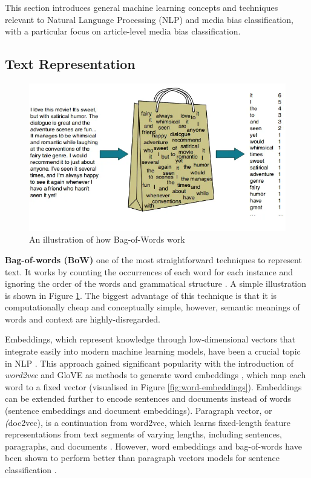 This section introduces general machine learning concepts and techniques relevant to Natural Language Processing (NLP) and media bias classification, with a particular focus on article-level media bias classification.

\subsection{Text Representation}

\begin{figure}[htbp]
    \centering
    \includegraphics[width=0.7\linewidth]{images/bow_illustration.png}
    \caption{An illustration of how Bag-of-Words work \cite{rahul-2023-bow-medium}}
    \label{fig:bow_illustration}
\end{figure}

\textbf{Bag-of-words (BoW)} one of the most straightforward techniques to represent text. It works by counting the occurrences of each word for each instance and ignoring the order of the words and grammatical structure \cite{qader-2019-bow}. A simple illustration is shown in Figure \ref{fig:bow_illustration}. The biggest advantage of this technique is that it is computationally cheap and conceptually simple, however, semantic meanings of words and context are highly-disregarded.

Embeddings, which represent knowledge through low-dimensional vectors that integrate easily into modern machine learning models, have been a crucial topic in NLP \cite{camacho-collados-2020-embeddings}. This approach gained significant popularity with the introduction of \textit{word2vec} and GloVE \cite{pennington-2014-glove} as methods to generate word embeddings \cite{mikolov-2013-embeddings}, which map each word to a fixed vector (visualised in Figure \ref{fig:word-embeddings}). Embeddings can be extended further to encode sentences and documents instead of words (sentence embeddings and document embeddings). Paragraph vector, or \textit(doc2vec), is a continuation from word2vec, which learns fixed-length feature representations from text segments of varying lengths, including sentences, paragraphs, and documents \cite{mikolov-2014-doc2vec}. However, word embeddings and bag-of-words have been shown to perform better than paragraph vectors models for sentence classification \cite{white-2015-how-well-sentence-embeddings}.

